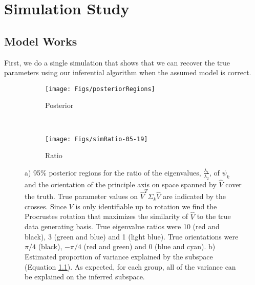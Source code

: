 \documentclass{article}
\newcommand{\etr}{\text{etr}}
\begin{document}




\section{Simulation Study}
\label{sec:simulation}

\subsection{Model Works}
First, we do a single simulation that shows that we can recover the
true parameters using our inferential algorithm when the assumed model
is correct.

\begin{figure}[t]
    \centering
    \begin{subfigure}[b]{0.45\textwidth}
    \texttt{[image: Figs/posteriorRegions]}
        \caption{Posterior}
        \label{fig:simPosterior}
    \end{subfigure}
    ~ %
    \begin{subfigure}[b]{0.45\textwidth}
        \texttt{[image: Figs/simRatio-05-19]}
        \caption{Ratio}
        \label{fig:simRatio}
    \end{subfigure}
    \caption{a) 95\% posterior regions for the ratio of the eigenvalues,
      $\frac{\lambda_1}{\lambda_2}$, of $\psi_k$ and the orientation
      of the principle axis on space spanned by $\hat{V}$ cover the
      truth.  True parameter values on $\hat{V}^T\Sigma_k\hat{V}$ are
      indicated by the crosses.  Since $V$ is only identifiable up to
      rotation we find the Procrustes rotation that maximizes the
      similarity of $\hat{V}$ to the true data generating basis. True
      eigenvalue ratios were 10 (red and black), 3 (green and blue)
      and 1 (light blue).  True orientations were $\pi/4$ (black), $-\pi/4$
      (red and green) and 0 (blue and cyan).  b)  Estimated proportion
    of variance explained by the subspace (Equation \ref{}).  As expected, for each
    group, all of the variance can be explained on the inferred subspace.  }
\end{figure}
\end{document}
